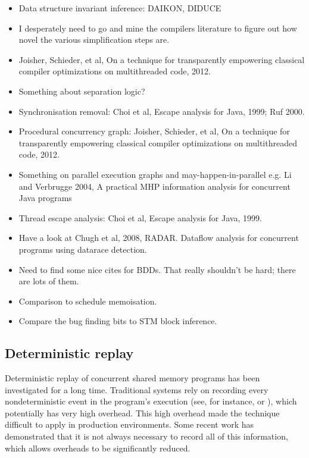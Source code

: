 \begin{itemize}
\item Data structure invariant inference: DAIKON, DIDUCE
\item I desperately need to go and mine the compilers literature to
  figure out how novel the various simplification steps are.
\item
  Joisher, Schieder, et al, On a technique for transparently empowering classical compiler optimizations on multithreaded code, 2012.
\item
  Something about separation logic?
\item
  Synchronisation removal: Choi et al, Escape analysis for Java, 1999; Ruf 2000.
\item
  Procedural concurrency graph: Joisher, Schieder, et al, On a technique for transparently empowering classical compiler optimizations on multithreaded code, 2012.
\item
  Something on parallel execution graphs and may-happen-in-parallel e.g. Li and Verbrugge 2004, A practical MHP information analysis for concurrent Java programs
\item
  Thread escape analysis: Choi et al, Escape analysis for Java, 1999.
\item
  Have a look at Chugh et al, 2008, RADAR.  Dataflow analysis for
  concurrent programs using datarace detection.
\item
  Need to find some nice cites for BDDs.  That really shouldn't be
  hard; there are lots of them.
\item
  Comparison to schedule memoisation.
\item
  Compare the bug finding bits to STM block inference.
\end{itemize}

\subsection{Deterministic replay}


Deterministic replay of concurrent shared memory programs has been
investigated for a long time.  Traditional systems rely on recording
every nondeterministic event in the program's execution (see, for
instance, \cite{LeBlanc1987} or \cite{Dunlap2002}), which potentially
has very high overhead.  This high overhead made the technique
difficult to apply in production environments.  Some recent work has
demonstrated that it is not always necessary to record all of this
information, which allows overheads to be significantly reduced.


